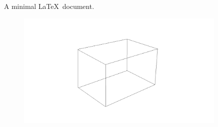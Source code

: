 \documentclass{article}
\begin{document}
A minimal \LaTeX\ document.

\begin{figure}
\centering
\includegraphics[width=4in]{box}
\end{figure}
\end{document}
